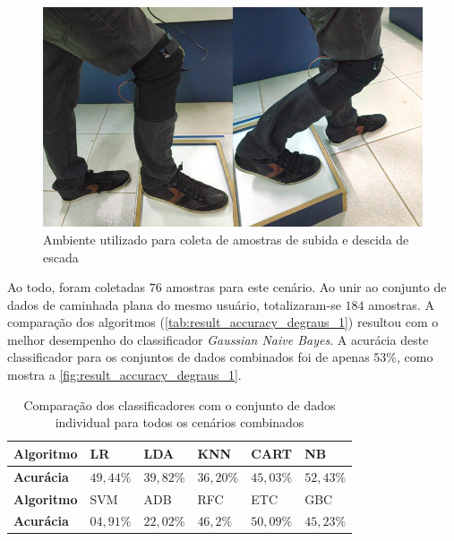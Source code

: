 \begin{figure}[ht]
	\caption{\label{fig:result_poses_degraus}Ambiente utilizado para coleta de amostras de subida e descida de escada}
	\begin{center}
		\includegraphics[width=.8\textwidth]{resources/result_poses_degraus}
	\end{center}
\end{figure}

Ao todo, foram coletadas \(76\) amostras para este cenário. Ao unir ao conjunto de dados de caminhada plana do mesmo usuário, totalizaram-se \(184\) amostras. A comparação dos algoritmos (\autoref{tab:result_accuracy_degraus_1}) resultou com o melhor desempenho do classificador \textit{Gaussian Naive Bayes}. A acurácia deste classificador para os conjuntos de dados combinados foi de apenas \(53\%\), como mostra a \autoref{fig:result_accuracy_degraus_1}.


\begin{table}[ht]
	\caption{Comparação dos classificadores com o conjunto de dados individual para todos os cenários combinados}%
	\label{tab:result_accuracy_degraus_1}
	\begin{tabularx}{\textwidth}{X X X X X X}
		\toprule
		\textbf{Algoritmo} & LR            & LDA           & KNN           & CART          & NB            \\ \midrule
		\textbf{Acurácia}  & \(49{,}44\%\) & \(39{,}82\%\) & \(36{,}20\%\) & \(45{,}03\%\) & \(52{,}43\%\) \\ \bottomrule \toprule
		\textbf{Algoritmo} & SVM           & ADB           & RFC           & ETC           & GBC           \\ \midrule
		\textbf{Acurácia}  & \(04{,}91\%\) & \(22{,}02\%\) & \(46{,}2\%\)  & \(50{,}09\%\) & \(45{,}23\%\) \\ \bottomrule
	\end{tabularx}
\end{table}


